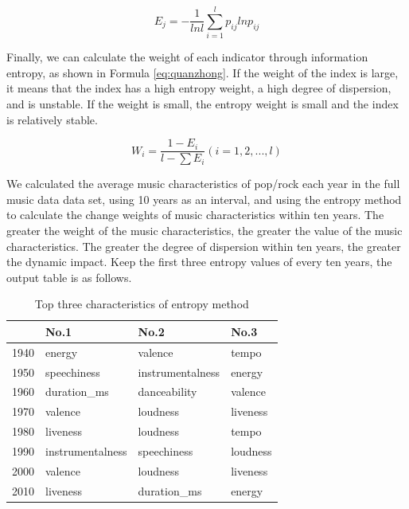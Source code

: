 \documentclass[12pt]{article}  %
\begin{document}
\begin{equation}\label{eq:E}
    E_j=-\frac{1}{ln l}\sum_{i=1}^{l}p_{ij}lnp_{ij}
\end{equation}

Finally, we can calculate the weight of each indicator through information entropy, as shown in Formula \ref{eq:quanzhong}. If the weight of the index is large, it means that the index has a high entropy weight, a high degree of dispersion, and is unstable. If the weight is small, the entropy weight is small and the index is relatively stable. 

\begin{equation}\label{eq:quanzhong}
    W_i = \frac{1-E_i}{l-\sum E_i}\left ( i=1,2,...,l \right )
\end{equation}


We calculated the average music characteristics of pop/rock each year in the full music data data set, using 10 years as an interval, and using the entropy method to calculate the change weights of music characteristics within ten years. The greater the weight of the music characteristics, the greater the value of the music characteristics. The greater the degree of dispersion within ten years, the greater the dynamic impact. Keep the first three entropy values of every ten years, the output table is as follows.

\begin{table}[htbp]
\small
\centering
\caption{Top three characteristics of entropy method}
\label{tab:Entropy method data}
\begin{tabular}{l|lll}
     & No.1             & No.2             & No.3         \\ \hline
1940 & energy           & valence          & tempo        \\
1950 & speechiness      & instrumentalness & energy       \\
1960 & duration\_ms     & danceability     & valence      \\
1970 & valence          & loudness         & liveness     \\
1980 & liveness         & loudness         & tempo        \\
1990 & instrumentalness & speechiness      & loudness     \\
2000 & valence          & loudness         & liveness     \\
2010 & liveness         & duration\_ms     & energy
\end{tabular}
\end{table}
\end{document}
